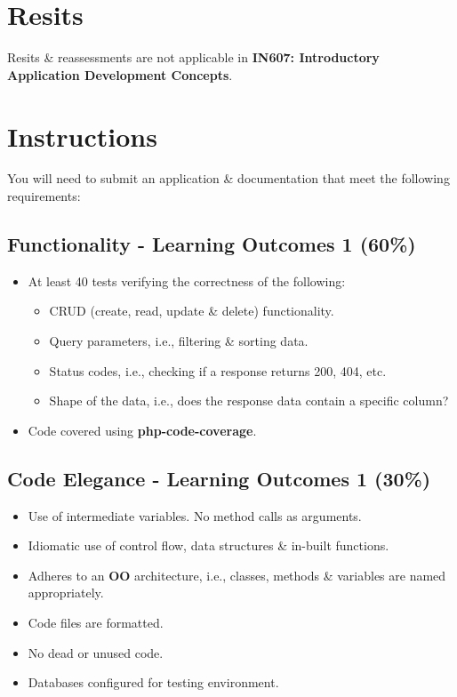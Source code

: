 \documentclass{article}
\begin{document}
\section*{Resits}
Resits \& reassessments are not applicable in \textbf{IN607: Introductory Application Development Concepts}. 

\newpage

\section*{Instructions}
You will need to submit an application \& documentation that meet the following requirements:

\subsection*{Functionality - Learning Outcomes 1 (60\%)}
\begin{itemize}
	\item At least 40 tests verifying the correctness of the following:
	\begin{itemize}
    \item CRUD (create, read, update \& delete) functionality.
    \item Query parameters, i.e., filtering \& sorting data.
    \item Status codes, i.e., checking if a response returns 200, 404, etc.
    \item Shape of the data, i.e., does the response data contain a specific column?
  \end{itemize}
  \item Code covered using \textbf{php-code-coverage}.
\end{itemize}

\subsection*{Code Elegance - Learning Outcomes 1 (30\%)}
\begin{itemize}
	\item Use of intermediate variables. No method calls as arguments.
	\item Idiomatic use of control flow, data structures \& in-built functions.
	\item Adheres to an \textbf{OO} architecture, i.e., classes, methods \& variables are named appropriately.
	\item Code files are formatted.
	\item No dead or unused code.
	\item Databases configured for testing environment.
\end{itemize}
\end{document}
